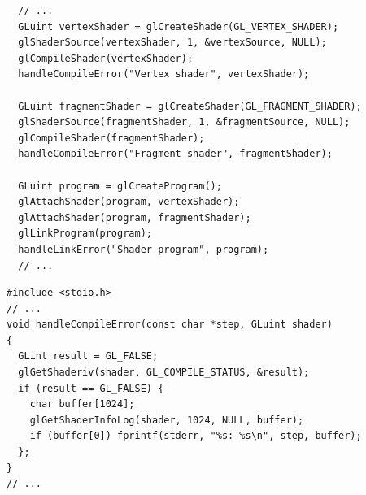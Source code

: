 \documentclass[calcdimensions,landscape,letterpaper]{powersem}
\newcommand{\thecurrentheading}{}
\newcommand{\heading}[1]{\renewcommand{\thecurrentheading}{#1}}
\begin{document}
\begin{slide}
    \heading{Minimal Pipeline: Compile \& Link Shaders}
    \begin{center}
        \begin{minipage}[c]{.95\textwidth}
            \begin{verbatim}
  // ...
  GLuint vertexShader = glCreateShader(GL_VERTEX_SHADER);
  glShaderSource(vertexShader, 1, &vertexSource, NULL);
  glCompileShader(vertexShader);
  handleCompileError("Vertex shader", vertexShader);

  GLuint fragmentShader = glCreateShader(GL_FRAGMENT_SHADER);
  glShaderSource(fragmentShader, 1, &fragmentSource, NULL);
  glCompileShader(fragmentShader);
  handleCompileError("Fragment shader", fragmentShader);

  GLuint program = glCreateProgram();
  glAttachShader(program, vertexShader);
  glAttachShader(program, fragmentShader);
  glLinkProgram(program);
  handleLinkError("Shader program", program);
  // ...
            \end{verbatim}
        \end{minipage}
    \end{center}
\end{slide}

\begin{slide}
    \heading{Minimal Pipeline: Compile Errors}
    \begin{center}
        \begin{minipage}[c]{.95\textwidth}
            \begin{verbatim}
#include <stdio.h>
// ...
void handleCompileError(const char *step, GLuint shader)
{
  GLint result = GL_FALSE;
  glGetShaderiv(shader, GL_COMPILE_STATUS, &result);
  if (result == GL_FALSE) {
    char buffer[1024];
    glGetShaderInfoLog(shader, 1024, NULL, buffer);
    if (buffer[0]) fprintf(stderr, "%s: %s\n", step, buffer);
  };
}
// ...
            \end{verbatim}
        \end{minipage}
    \end{center}
\end{slide}
\end{document}
